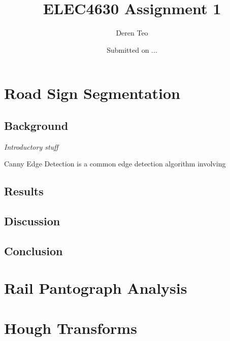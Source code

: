\documentclass[a4paper, 11pt]{article}
\title{ELEC4630 Assignment 1}
\author{Deren Teo}
\date{Submitted on ...}
\begin{document}
  \maketitle

  \newpage
  \section{Road Sign Segmentation}
  \subsection{Background}

  \textit{Introductory stuff}

  Canny Edge Detection is a common edge detection algorithm involving 

  \subsection{Results}

  \subsection{Discussion}

  \subsection{Conclusion}

  \newpage
  \section{Rail Pantograph Analysis}

  \newpage
  \section{Hough Transforms}
\end{document}
